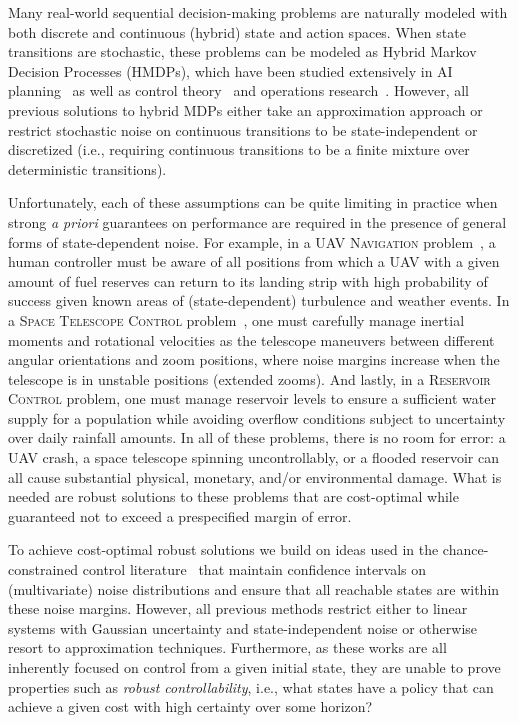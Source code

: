 
Many real-world sequential decision-making problems are naturally
modeled with both discrete and continuous (hybrid) state and action
spaces.  When state transitions are stochastic, these problems can be
modeled as Hybrid Markov Decision Processes (HMDPs), which have been
studied extensively in AI
planning~\cite{boyan01,feng04,li05,kveton06,phase07,hao09,sdp_aaai}
as well as control theory~\cite{Henzinger:1997,Hu:2000,DeSHee:2009}
and operations research~\cite{puterman}.  However, all previous
solutions to hybrid MDPs either take an approximation approach or
restrict stochastic noise on continuous transitions to be
state-independent or discretized (i.e., requiring continuous
transitions to be a finite mixture over deterministic transitions).

Unfortunately, each of these assumptions can be quite limiting in
practice when strong \emph{a priori} guarantees on performance are
required in the presence of general forms of state-dependent noise.
For example, in a \textsc{UAV Navigation} problem~\cite{}, a human
controller must be aware of all positions from which a UAV with a
given amount of fuel reserves can return to its landing strip with
high probability of success given known areas of (state-dependent)
turbulence and weather events.  In a \textsc{Space Telescope Control}
problem~\cite{}, one must carefully manage inertial moments and
rotational velocities as the telescope maneuvers between different
angular orientations and zoom positions, where noise margins increase
when the telescope is in unstable positions (extended zooms).  And
lastly, in a \textsc{Reservoir Control} problem, one must manage
reservoir levels to ensure a sufficient water supply for a population
while avoiding overflow conditions subject to uncertainty over daily
rainfall amounts.  In all of these problems, there is no room for
error: a UAV crash, a space telescope spinning uncontrollably, or a
flooded reservoir can all cause substantial physical, monetary, and/or
environmental damage.  What is needed are robust solutions to these
problems that are cost-optimal while guaranteed not to exceed a
prespecified margin of error.

To achieve cost-optimal robust solutions we build on ideas
used in the chance-constrained control
literature~\cite{Schwarm:1999,Li:2002,Ono:2008,Blackmore:2011} that
maintain confidence intervals on (multivariate) noise distributions
and ensure that all reachable states are within these noise margins.
However, all previous methods restrict either to linear systems with
Gaussian uncertainty and state-independent noise or otherwise resort
to approximation techniques.  Furthermore, as these works are all
inherently focused on control from a given initial state, they are
unable to prove properties such as \emph{robust controllability},
i.e., what states have a policy that can achieve a given cost with
high certainty over some horizon?

